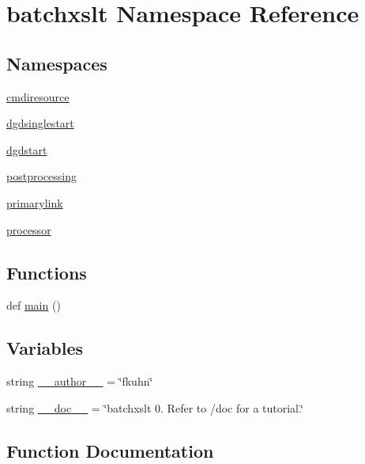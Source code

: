 \hypertarget{namespacebatchxslt}{}\section{batchxslt Namespace Reference}
\label{namespacebatchxslt}
\subsection*{Namespaces}
\begin{DoxyCompactItemize}
\item 
 \hyperlink{namespacebatchxslt_1_1cmdiresource}{cmdiresource}
\item 
 \hyperlink{namespacebatchxslt_1_1dgdsinglestart}{dgdsinglestart}
\item 
 \hyperlink{namespacebatchxslt_1_1dgdstart}{dgdstart}
\item 
 \hyperlink{namespacebatchxslt_1_1postprocessing}{postprocessing}
\item 
 \hyperlink{namespacebatchxslt_1_1primarylink}{primarylink}
\item 
 \hyperlink{namespacebatchxslt_1_1processor}{processor}
\end{DoxyCompactItemize}
\subsection*{Functions}
\begin{DoxyCompactItemize}
\item 
def \hyperlink{namespacebatchxslt_ad38cc6da293934d81aa5c1a1880686a6}{main} ()
\end{DoxyCompactItemize}
\subsection*{Variables}
\begin{DoxyCompactItemize}
\item 
string \hyperlink{namespacebatchxslt_acf44ae090fc4a15605fda5e9d62af19d}{\+\_\+\+\_\+author\+\_\+\+\_\+} = \char`\"{}fkuhn\char`\"{}
\item 
string \hyperlink{namespacebatchxslt_a29a9874aaaf5252371f8b4ef7f7f0562}{\+\_\+\+\_\+doc\+\_\+\+\_\+} = \char`\"{}batchxslt 0. Refer to /doc for a tutorial.\char`\"{}
\end{DoxyCompactItemize}


\subsection{Function Documentation}
\hypertarget{namespacebatchxslt_ad38cc6da293934d81aa5c1a1880686a6}{}

